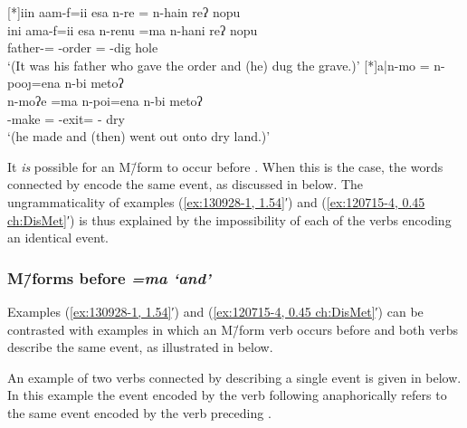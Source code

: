 \begin{exe}
	{\glll	iin aam-f=ii esa n-re = n-hain reʔ nopu\\
						ini ama-f=ii esa n-renu =ma n-hani reʔ nopu\\
						{\iin} father-{\F}={\ii} {\esc} \n-order{\tbrM} = \n-dig{\M} {\reqt} hole\\
			\glt	`(It was his father who gave the order and (he) dug the grave.)' }
	{\glll	a|n-mo = n-poo\j=ena n-bi metoʔ\\
						{\a}n-moʔe =ma n-poi=ena n-bi metoʔ\\
						{\a\n}-make{\tbrM} = \n-exit{\Mv}={\een} \n-{\bi} dry\\
			\glt	{}`(he made and (then) went out onto dry land.)' \txrf{elicit. 13/02/16 p.16}}
\end{exe}

It \emph{is} possible for an M\=/form to occur before .
When this is the case, the words connected by 
encode the same event, as discussed in  below.
The ungrammaticality of examples (\ref{ex:130928-1, 1.54}′)
and (\ref{ex:120715-4, 0.45 ch:DisMet}′) is thus explained by the impossibility
of each of the verbs encoding an identical event.

\subsubsection{M\=/forms before \it{=ma} `and'}\label{sec:Mfo=Ma}
Examples (\ref{ex:130928-1, 1.54}′) and (\ref{ex:120715-4, 0.45 ch:DisMet}′)
can be contrasted with examples in which an M\=/form verb occurs before 
and both verbs describe the same event, as illustrated in  below.

	\begin{exe}\let\eachwordone=\textnormal
		\label{ex:=ma2}
	\end{exe}

An example of two verbs connected by  describing a single event
is given in  below.
In this example the event encoded by the verb following 
anaphorically refers to the same event encoded by the verb preceding .

